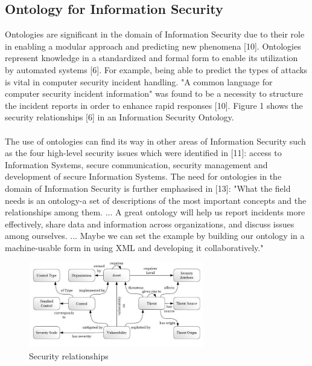 \documentclass[conference, compsoc]{IEEEtran}
\begin{document}
\subsection{Ontology for Information Security}
Ontologies are significant in the domain of Information Security due to their role in enabling a modular approach and predicting new phenomena [10]. Ontologies represent knowledge in a standardized and formal form to enable its utilization by automated systems [6]. For example, being able to predict the types of attacks is vital in computer security incident handling. "A common language for computer security incident information" was found to be a necessity to structure the incident reports in order to enhance rapid responses [10]. Figure 1 shows the  security relationships [6] in an Information Security Ontology.
\\
\\
The use of ontologies can find its way in other areas of Information Security such as the four high-level security issues which were identified in [11]: access to Information Systems, secure communication, security management and development of secure Information Systems. The need for ontologies in the domain of Information Security is further emphasised in [13]: "What the field needs is an ontology-a set of descriptions of the most important concepts and the relationships among them. ... A great ontology will help us report incidents more effectively, share data and information across organizations, and discuss issues among ourselves. ... Maybe we can set the example by building our ontology in a machine-usable form in using XML and developing it collaboratively."

\begin{figure}[!t]
\centering
\includegraphics[width=3.0in]{sec-relationships}
\caption{Security relationships}
\label{sec-relationships}
\end{figure}
\end{document}
